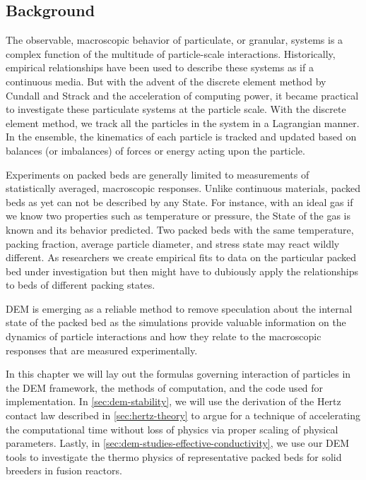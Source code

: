 \subsection{Background}
\label{sec:dem-intro}

The observable, macroscopic behavior of particulate, or granular, systems is a complex function of the multitude of particle-scale interactions. Historically, empirical relationships have been used to describe these systems as if a continuous media. But with the advent of the discrete element method by Cundall and Strack\cite{Cundall1979} and the acceleration of computing power, it became practical to investigate these particulate systems at the particle scale. With the discrete element method, we track all the particles in the system in a Lagrangian manner. In the ensemble, the kinematics of each particle is tracked and updated based on balances (or imbalances) of forces or energy acting upon the particle.

Experiments on packed beds are generally limited to measurements of statistically averaged, macroscopic responses. Unlike continuous materials, packed beds as yet can not be described by any State. For instance, with an ideal gas if we know two properties such as temperature or pressure, the State of the gas is known and its behavior predicted. Two packed beds with the same temperature, packing fraction, average particle diameter, and stress state may react wildly different. As researchers we create empirical fits to data on the particular packed bed under investigation but then might have to dubiously apply the relationships to beds of different packing states. 

DEM is emerging as a reliable method to remove speculation about the internal state of the packed bed as the simulations provide valuable information on the dynamics of particle interactions and how they relate to the macroscopic responses that are measured experimentally.

In this chapter we will lay out the formulas governing interaction of particles in the DEM framework, the methods of computation, and the code used for implementation. In \cref{sec:dem-stability}, we will use the derivation of the Hertz contact law described in \cref{sec:hertz-theory} to argue for a technique of accelerating the computational time without loss of physics via proper scaling of physical parameters. Lastly, in \cref{sec:dem-studies-effective-conductivity}, we use our DEM tools to investigate the thermo physics of representative packed beds for solid breeders in fusion reactors.
